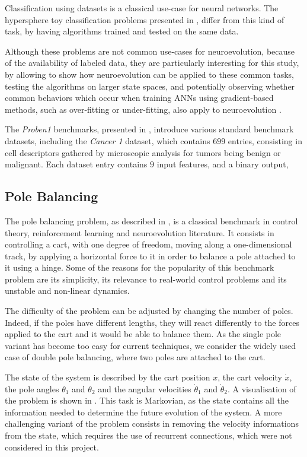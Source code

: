 Classification using datasets is a classical use-case for neural networks.
The hypersphere toy classification problems \cite{na,} presented in , differ from this kind of task, by having
algorithms trained and tested on the same data.

Although these problems are not common use-cases for neuroevolution, because of the availability of labeled data,
they are particularly interesting for this study, by allowing to show how neuroevolution can be applied to these common tasks, testing
the algorithms on larger state spaces, and potentially observing whether common behaviors which occur when training ANNs using gradient-based methods,
such as over-fitting or under-fitting, also apply to neuroevolution \cite{overfitting}.

The \textit{Proben1} benchmarks, presented in \cite{proben}, introduce various standard benchmark datasets, including the \textit{Cancer 1} dataset, which
contains $699$ entries, consisting in cell descriptors gathered by microscopic analysis for tumors being benign or malignant.
Each dataset entry contains $9$ input features, and a binary output,

\subsection{Pole Balancing}

The pole balancing problem, as described in \cite{pole_balancing}, is a classical benchmark in control theory, reinforcement learning and neuroevolution literature.
It consists in controlling a cart, with one degree of freedom, moving along a one-dimensional track, by applying a horizontal force to it in order to balance a pole attached to it using a hinge.
Some of the reasons for the popularity of this benchmark problem are its simplicity, its relevance to real-world control problems and its unstable and non-linear dynamics.


The difficulty of the problem can be adjusted by changing the number of poles. Indeed, if the poles have different lengths, they will react differently to the forces applied to the cart
and it would be able to balance them.
As the single pole variant has become too easy for current techniques, we consider the widely used case of double pole balancing, where two poles are attached to the cart.

The state of the system is described by the cart position $x$, the cart velocity $\dot{x}$, the pole angles $\theta_1$ and $\theta_2$ and the angular velocities $\dot{\theta}_1$ and $\dot{\theta}_2$.
A visualisation of the problem is shown in .
This task is Markovian, as the state contains all the information needed to determine the future evolution of the system.
A more challenging variant of the problem consists in removing the velocity informations from the state, which requires the use of recurrent connections, which were not considered
in this project.

